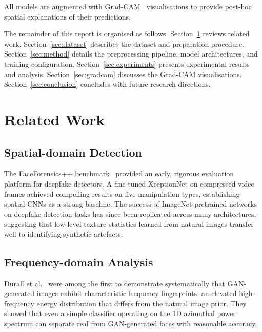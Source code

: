 \documentclass[12pt, a4paper]{article}
\begin{document}
All models are augmented with Grad-CAM~\cite{selvaraju2017gradcam}
visualisations to provide post-hoc spatial explanations of their predictions.

The remainder of this report is organised as follows.
Section~\ref{sec:related} reviews related work.
Section~\ref{sec:dataset} describes the dataset and preparation procedure.
Section~\ref{sec:method} details the preprocessing pipeline, model
architectures, and training configuration.
Section~\ref{sec:experiments} presents experimental results and analysis.
Section~\ref{sec:gradcam} discusses the Grad-CAM visualisations.
Section~\ref{sec:conclusion} concludes with future research directions.

\section{Related Work}
\label{sec:related}

\subsection{Spatial-domain Detection}

The FaceForensics++ benchmark~\cite{rossler2019faceforensics} provided an
early, rigorous evaluation platform for deepfake detectors.  A fine-tuned
XceptionNet on compressed video frames achieved compelling results on five
manipulation types, establishing spatial CNNs as a strong baseline.  The
success of ImageNet-pretrained networks on deepfake detection tasks has since
been replicated across many architectures, suggesting that low-level texture
statistics learned from natural images transfer well to identifying synthetic
artefacts.

\subsection{Frequency-domain Analysis}

Durall et al.~\cite{durall2019unmasking} were among the first to demonstrate
systematically that GAN-generated images exhibit characteristic frequency
fingerprints: an elevated high-frequency energy distribution that differs from
the natural image prior.  They showed that even a simple classifier operating
on the 1D azimuthal power spectrum can separate real from GAN-generated faces
with reasonable accuracy.
\end{document}
